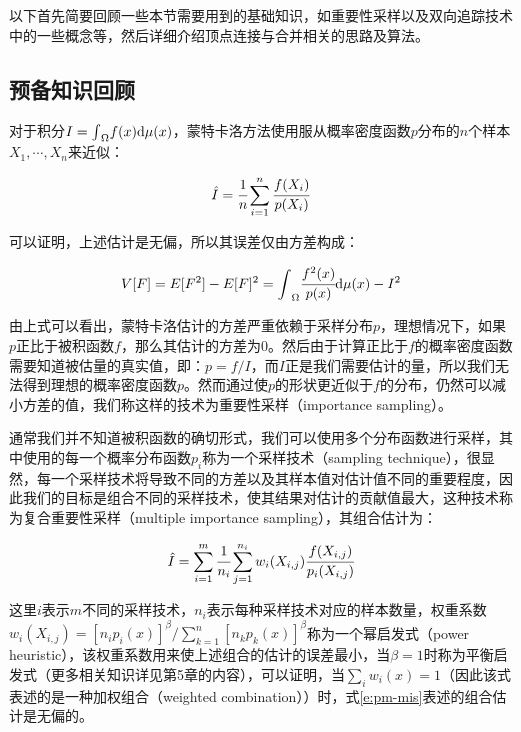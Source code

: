 以下首先简要回顾一些本节需要用到的基础知识，如重要性采样以及双向追踪技术中的一些概念等，然后详细介绍顶点连接与合并相关的思路及算法。





\subsection{预备知识回顾}
对于积分$I={\rm \int}_{\Omega}f(x){\rm d}\mu (x)$，蒙特卡洛方法使用服从概率密度函数$p$分布的$n$个样本$X_1,\cdots,X_n$来近似：

\begin{equation}
	\hat{I}= \cfrac{1}{n}\sum^{n}_{i=1} \cfrac{f(X_i)}{p(X_i)}
\end{equation}

可以证明，上述估计是无偏，所以其误差仅由方差构成：

\begin{equation}
	V[F]=E[F^{2}]-E[F]^{2}={\rm \int}_{\Omega} \cfrac{f^{2}(x)}{p(x)}{\rm d}\mu (x)-I^{2}
\end{equation}

由上式可以看出，蒙特卡洛估计的方差严重依赖于采样分布$p$，理想情况下，如果$p$正比于被积函数$f$，那么其估计的方差为0。然后由于计算正比于$f$的概率密度函数需要知道被估量的真实值，即：$p=f/I$，而$I$正是我们需要估计的量，所以我们无法得到理想的概率密度函数$p$。然而通过使$p$的形状更近似于$f$的分布，仍然可以减小方差的值，我们称这样的技术为重要性采样（importance sampling）。

通常我们并不知道被积函数的确切形式，我们可以使用多个分布函数进行采样，其中使用的每一个概率分布函数$p_i$称为一个采样技术（sampling technique），很显然，每一个采样技术将导致不同的方差以及其样本值对估计值不同的重要程度，因此我们的目标是组合不同的采样技术，使其结果对估计的贡献值最大，这种技术称为复合重要性采样（multiple importance sampling），其组合估计为：

\begin{equation}\label{e:pm-mis}
	\hat{I}=\sum^{m}_{i=1} \cfrac{1}{n_i}\sum^{n_i}_{j=1}w_i(X_{i,j}) \cfrac{f(X_{i,j})}{p_i(X_{i,j})}
\end{equation}

\noindent 这里$i$表示$m$不同的采样技术，$n_i$表示每种采样技术对应的样本数量，权重系数$w_i(X_{i,j})=[n_ip_i(x)]^{\beta}/\sum^{n}_{k=1}[n_kp_k(x)]^{\beta}$称为一个幂启发式（power heuristic），该权重系数用来使上述组合的估计的误差最小，当$\beta=1$时称为平衡启发式（更多相关知识详见第5章的内容），可以证明，当$\sum_iw_i(x)=1$（因此该式表述的是一种加权组合（weighted combination））时，式\ref{e:pm-mis}表述的组合估计是无偏的。

